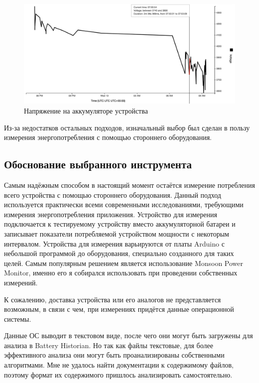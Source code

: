 \documentclass[a4paper,14pt]{extarticle} %
\begin{document}
	\begin{figure}[htb]
		\includegraphics[width=\textwidth]{historian_voltage}
		\caption{Напряжение на аккумуляторе устройства}
		\label{fig:historian_voltage}
	\end{figure}

	Из-за недостатков остальных подходов, изначальный выбор был сделан в пользу измерения энергопотребления с помощью стороннего оборудования.
	
	\subsection{Обоснование выбранного инструмента}
	
	Самым надёжным способом в настоящий момент остаётся измерение потребления всего устройства с помощью стороннего оборудования. Данный подход используется практически всеми современными исследованиями, требующими измерения энергопотребления приложения. Устройство для измерения подключается к тестируемому устройству вместо аккумуляторной батареи и записывает показатели потребляемой устройством мощности с некоторым интервалом. Устройства для измерения варьируются от платы Arduino с небольшой программой до оборудования, специально созданного для таких целей. Самым популярным решением является использование Monsoon Power Monitor, именно его я собирался использовать при проведении собственных измерений.
	
	К сожалению, доставка устройства или его аналогов не представляется возможным, в связи с чем, при измерениях придётся данные операционной системы.
	
	Данные ОС выводит в текстовом виде, после чего они могут быть загружены для анализа в Battery Historian. Но так как файлы текстовые, для более эффективного анализа они могут быть проанализированы собственными алгоритмами. Мне не удалось найти документации к содержимому файлов, поэтому формат их содержимого пришлось анализировать самостоятельно.
	
\end{document}
